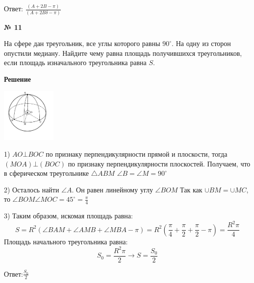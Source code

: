     Ответ: $\frac{(A + 2B - \pi)}{(A + 2B\delta - \pi)}$

    \begin{center}
        \textbf{№ 11}
    \end{center}

    На сфере дан треугольник, все углы которого равны $90^\circ$.
    На одну из сторон опустили медиану.
    Найдите чему равна площадь получившихся треугольников, если площадь изначального треугольника равна $S$.

    \textbf{Решение}\\

    \begin{center}
        \includegraphics[width=0.2\textwidth]{images/img9}\\
    \end{center}

    1) $AO\bot BOC$ по признаку перпендикулярности прямой и плоскости, тогда $(MOA)\bot(BOC)$ по признаку перпендикулярности
    плоскостей.
    Получаем, что в сферическом треугольнике $\triangle ABM$ $\angle B = \angle M = 90^\circ$

    2) Осталось найти $\angle A$.
    Он равен линейному углу $\angle BOM$
    Так как $\cup BM = \cup MC$, то $\angle BOM \angle MOC = 45^\circ = \frac{\pi}{4}$

    3) Таким образом, искомая площадь равна:
    \[
        S = R^2(\angle BAM + \angle AMB + \angle MBA - \pi) =
        R^2\left(\frac{\pi}{4} + \frac{\pi}{2}+ \frac{\pi}{2} - \pi\right) =
        \frac{R^2\pi}{4}
    \]
    Площадь начального треугольника равна:
    \[
        S_0 = \frac{R^2\pi}{2} \rightarrow S = \frac{S_0}{2}
    \]

    Ответ:$\frac{S_0}{2}$


